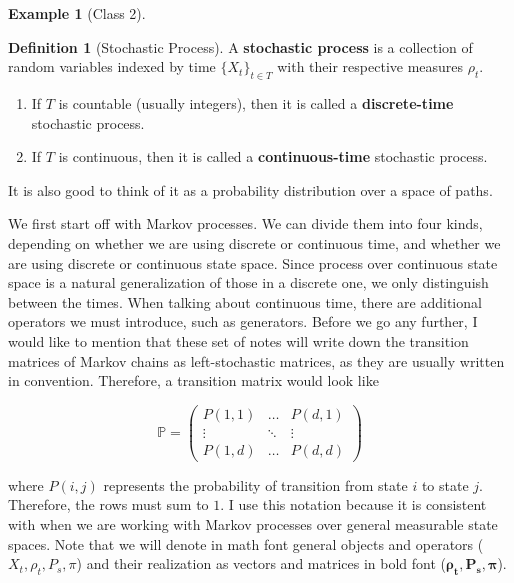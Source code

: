 \documentclass{article}
\theoremstyle{definition}
\newtheorem{example}{Example}[section]
\theoremstyle{remark}
\theoremstyle{definition}
\newtheorem{definition}{Definition}[section]
\begin{document}
  \begin{example}[Class 2]
    
  \end{example}

  \begin{definition}[Stochastic Process]
    A \textbf{stochastic process} is a collection of random variables indexed by time $\{X_t\}_{t \in T}$ with their respective measures $\rho_t$. 

    \begin{enumerate}
      \item If $T$ is countable (usually integers), then it is called a \textbf{discrete-time} stochastic process. 
      \item If $T$ is continuous, then it is called a \textbf{continuous-time} stochastic process. 
    \end{enumerate}

    It is also good to think of it as a probability distribution over a space of paths. 
  \end{definition}

  We first start off with Markov processes. We can divide them into four kinds, depending on whether we are using discrete or continuous time, and whether we are using discrete or continuous state space. Since process over continuous state space is a natural generalization of those in a discrete one, we only distinguish between the times. When talking about continuous time, there are additional operators we must introduce, such as generators. Before we go any further, I would like to mention that these set of notes will write down the transition matrices of Markov chains as left-stochastic matrices, as they are usually written in convention. Therefore, a transition matrix would look like 

    \[\mathbb{P} = \begin{pmatrix} P(1, 1) & \ldots & P(d, 1) \\ \vdots & \ddots & \vdots \\ P(1, d) & \ldots & P(d, d) \end{pmatrix} \]

  where $P(i, j)$ represents the probability of transition from state $i$ to state $j$. Therefore, the rows must sum to $1$. I use this notation because it is consistent with when we are working with Markov processes over general measurable state spaces. Note that we will denote in math font general objects and operators ($X_t, \rho_t, P_s, \pi$) and their realization as vectors and matrices in bold font ($\boldsymbol{\rho_t}, \mathbf{P_s}, \boldsymbol{\pi}$). 
\end{document}
